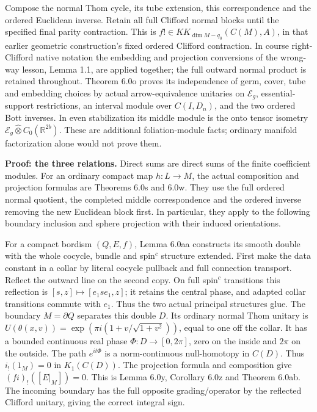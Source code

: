 \documentclass[
  11pt,
]{article}
\begin{document}
Compose the normal Thom cycle, its tube extension, this correspondence
and the ordered Euclidean inverse. Retain all full Clifford normal
blocks until the specified final parity contraction. This is
\(f!\in KK_{\dim M-q_0}(C(M),A)\), in that earlier geometric
construction's fixed ordered Clifford contraction. In course
right-Clifford native notation the embedding and projection conversions
of the wrong-way lesson, Lemma 1.1, are applied together; the full
outward normal product is retained throughout. Theorem 6.0o proves its
independence of germ, cover, tube and embedding choices by actual
arrow-equivalence unitaries on \(\mathcal E_g\), essential-support
restrictions, an interval module over \(C(I,D_n)\), and the two ordered
Bott inverses. In even stabilization its middle module is the onto
tensor isometry \(\mathcal E_g\widehat\otimes C_0(\mathbb R^{2b})\).
These are additional foliation-module facts; ordinary manifold
factorization alone would not prove them.

\textbf{Proof: the three relations.} Direct sums are direct sums of the
finite coefficient modules. For an ordinary compact map \(h:L\to M\),
the actual composition and projection formulas are Theorems 6.0s and
6.0w. They use the full ordered normal quotient, the completed middle
correspondence and the ordered inverse removing the new Euclidean block
first. In particular, they apply to the following boundary inclusion and
sphere projection with their induced orientations.

For a compact bordism \((Q,E,f)\), Lemma 6.0aa constructs its smooth
double with the whole cocycle, bundle and spin\(^{c}\) structure
extended. First make the data constant in a collar by literal cocycle
pullback and full connection transport. Reflect the outward line on the
second copy. On full spin\(^{c}\) transitions this reflection is
\([s,z]\mapsto[e_1se_1,z]\); it retains the central phase, and adapted
collar transitions commute with \(e_1\). Thus the two actual principal
structures glue. The boundary \(M=\partial Q\) separates this double
\(D\). Its ordinary normal Thom unitary is
\(U(\theta(x,v))=\exp(\pi i(1+v/\sqrt{1+v^2}))\), equal to one off the
collar. It has a bounded continuous real phase \(\Phi:D\to[0,2\pi]\),
zero on the inside and \(2\pi\) on the outside. The path \(e^{it\Phi}\)
is a norm-continuous null-homotopy in \(C(D)\). Thus \(i_!(1_M)=0\) in
\(K_1(C(D))\). The projection formula and composition give
\((fi)_!([E|_M])=0\). This is Lemma 6.0y, Corollary 6.0z and Theorem
6.0ab. The incoming boundary has the full opposite grading/operator by
the reflected Clifford unitary, giving the correct integral sign.
\end{document}

